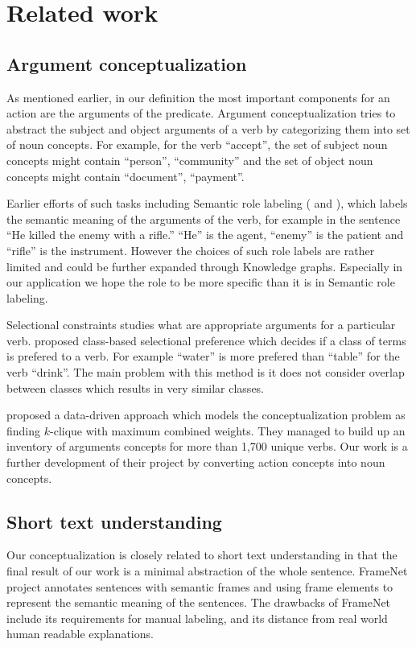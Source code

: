 \section{Related work}
\subsection{Argument conceptualization}
As mentioned earlier, in our definition the most important components for an action are the arguments of the predicate.
Argument conceptualization tries to abstract the subject and object arguments of a verb by categorizing them into set of noun concepts.
For example, for the verb ``accept'', the set of subject noun concepts might contain ``person'', ``community'' and
the set of object noun concepts might contain ``document'', ``payment''.

Earlier efforts of such tasks including Semantic role labeling (\cite{gildea2002automatic} and
\cite{palmer2005proposition}), which labels the semantic meaning of the arguments of the verb, for example
in the sentence ``He killed the enemy with a rifle.'' ``He'' is the agent, ``enemy'' is the patient and ``rifle'' is the instrument.
However the choices of such role labels are rather limited and could be further expanded through Knowledge graphs. Especially in our
application we hope the role to be more specific than it is in Semantic role labeling.

Selectional constraints studies what are appropriate arguments for a particular verb.
\cite{resnik1996selectional} proposed class-based selectional preference which decides if a class of terms is
prefered to a verb. For example ``water'' is more prefered than ``table'' for the verb ``drink''. The main problem with this
method is it does not consider overlap between classes which results in very similar classes.

\cite{gong2015representing} proposed a data-driven approach which models the conceptualization problem as
finding $k$-clique with maximum combined weights. They managed to build up an inventory of arguments concepts for
more than 1,700 unique verbs. Our work is a further development of their project by converting action concepts into
noun concepts.

\subsection{Short text understanding}
Our conceptualization is closely related to short text understanding in that the final result of our work is a minimal abstraction of the
whole sentence. FrameNet project \cite{baker1998berkeley} annotates sentences with semantic frames and using frame elements to represent
the semantic meaning of the sentences. The drawbacks of FrameNet include its requirements for manual labeling, and its distance from
real world human readable explanations.

